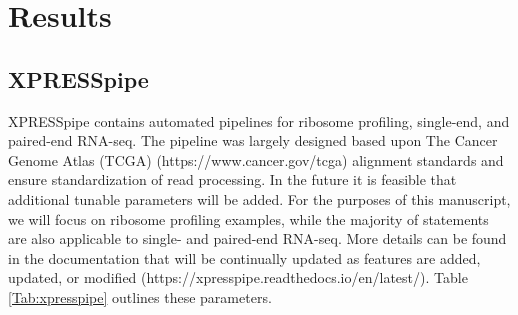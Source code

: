 \documentclass[11pt, a4paper, oneside]{article}
\begin{document}
\section{Results}

\subsection{XPRESSpipe}
XPRESSpipe contains automated pipelines for ribosome profiling, single-end, and paired-end RNA-seq. The pipeline was largely designed based upon The Cancer Genome Atlas (TCGA) (https://www.cancer.gov/tcga) alignment standards and ensure standardization of read processing. In the future it is feasible that additional tunable parameters will be added. For the purposes of this manuscript, we will focus on ribosome profiling examples, while the majority of statements are also applicable to single- and paired-end RNA-seq. More details can be found in the documentation that will be continually updated as features are added, updated, or modified (https://xpresspipe.readthedocs.io/en/latest/). Table \ref{Tab:xpresspipe} outlines these parameters.
\end{document}
